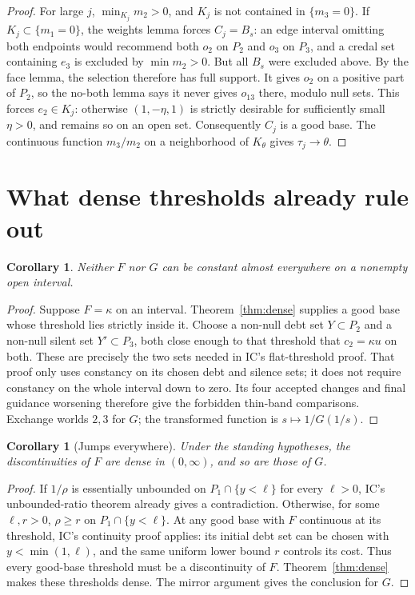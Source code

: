 \documentclass[11pt]{article}
\newtheorem{corollary}[theorem]{Corollary}
\theoremstyle{remark}\newtheorem{remark}[theorem]{Remark}
\begin{document}
\begin{proof}
For large $j$, $\min_{K_j}m_2>0$, and $K_j$ is not contained in
$\{m_3=0\}$. If $K_j\subset\{m_1=0\}$, the weights lemma forces
$C_j=B_s$: an edge interval omitting both endpoints would recommend both
$o_2$ on $P_2$ and $o_3$ on $P_3$, and a credal set containing $e_3$ is
excluded by $\min m_2>0$. But all $B_s$ were excluded above.
By the face lemma, the selection therefore has full support. It gives $o_2$ on a positive part of
$P_2$, so the no-both lemma says it never gives $o_{13}$ there, modulo
null sets. This forces $e_2\in K_j$: otherwise $(1,-\eta,1)$ is strictly
desirable for sufficiently small $\eta>0$, and remains so on an open set.
Consequently $C_j$ is a good base. The continuous function $m_3/m_2$ on
a neighborhood of $K_\theta$ gives $\tau_j\to\theta$.
\end{proof}

\section{What dense thresholds already rule out}

\begin{corollary}\label{cor:flat}
Neither $F$ nor $G$ can be constant almost everywhere on a nonempty open
interval.
\end{corollary}
\begin{proof}
Suppose $F=\kappa$ on an interval. Theorem~\ref{thm:dense} supplies a good
base whose threshold lies strictly inside it. Choose a non-null debt set
$Y\subset P_2$ and a non-null silent set $Y'\subset P_3$, both close enough
to that threshold that $c_2=\kappa u$ on both. These are precisely the two
sets needed in IC's flat-threshold proof. That proof only uses constancy
on its chosen debt and silence sets; it does not require constancy on the
whole interval down to zero. Its four accepted changes and final guidance
worsening therefore give the forbidden thin-band comparisons. Exchange
worlds $2,3$ for $G$; the transformed function is $s\mapsto1/G(1/s)$.
\end{proof}

\begin{corollary}[Jumps everywhere]\label{cor:jumps}
Under the standing hypotheses, the discontinuities of $F$ are dense in
$(0,\infty)$, and so are those of $G$.
\end{corollary}
\begin{proof}
If $1/\rho$ is essentially unbounded on $P_1\cap\{y<\ell\}$ for every
$\ell>0$, IC's unbounded-ratio theorem already gives a contradiction.
Otherwise, for some $\ell,r>0$, $\rho\ge r$ on $P_1\cap\{y<\ell\}$.
At any good base with $F$ continuous at its threshold, IC's continuity
proof applies: its initial debt set can be chosen with
$y<\min(1,\ell)$, and the same uniform lower bound $r$ controls its cost.
Thus every good-base threshold must be a discontinuity of $F$.
Theorem~\ref{thm:dense} makes these thresholds dense. The mirror argument
gives the conclusion for $G$.
\end{proof}
\end{document}
